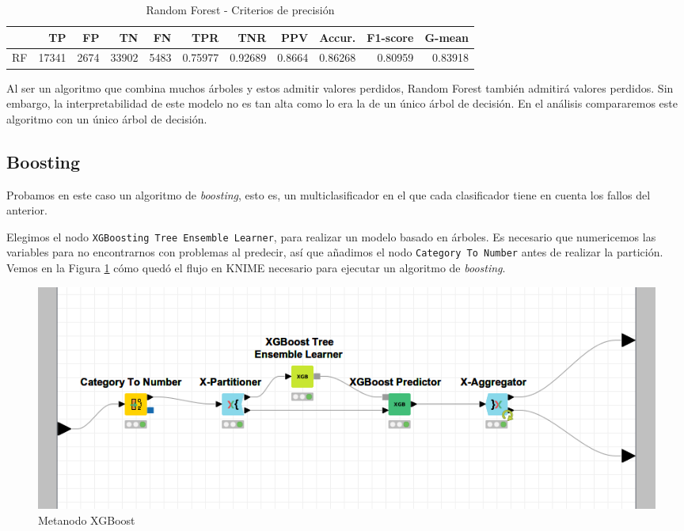 \documentclass[a4paper, 20pt]{article}
\begin{document}
\begin{table}[H]
\centering
\caption{Random Forest - Criterios de precisión}
\label{tab:RandomForest}
\begin{tabular}{lrrrrrrrrrr}
\toprule
 & TP & FP & TN & FN & TPR & TNR & PPV & Accur. & F1-score & G-mean\\ \midrule
RF & 17341 & 2674 & 33902 & 5483 & 0.75977 & 0.92689 & 0.8664 & 0.86268 & 0.80959 & 0.83918\\
\bottomrule
\end{tabular}
\end{table}

Al ser un algoritmo que combina muchos árboles y estos admitir valores perdidos, Random Forest también admitirá valores perdidos. Sin embargo, la interpretabilidad de este modelo no es tan alta como lo era la de un único árbol de decisión. En el análisis compararemos este algoritmo con un único árbol de decisión.


\subsection{Boosting}

Probamos en este caso un algoritmo de \textit{boosting}, esto es, un multiclasificador en el que cada clasificador tiene en cuenta los fallos del anterior.

Elegimos el nodo \texttt{XGBoosting Tree Ensemble Learner}, para realizar un modelo basado en árboles. Es necesario que numericemos las variables para no encontrarnos con problemas al predecir, así que añadimos el nodo \texttt{Category To Number} antes de realizar la partición. Vemos en la Figura \ref{fig:XGBoost} cómo quedó el flujo en KNIME necesario para ejecutar un algoritmo de \textit{boosting}.

\begin{figure}[H]
    \centering
    \includegraphics[width=1\textwidth]{XGBoost}
    \caption{Metanodo XGBoost}
    \label{fig:XGBoost}
\end{figure}
\end{document}
